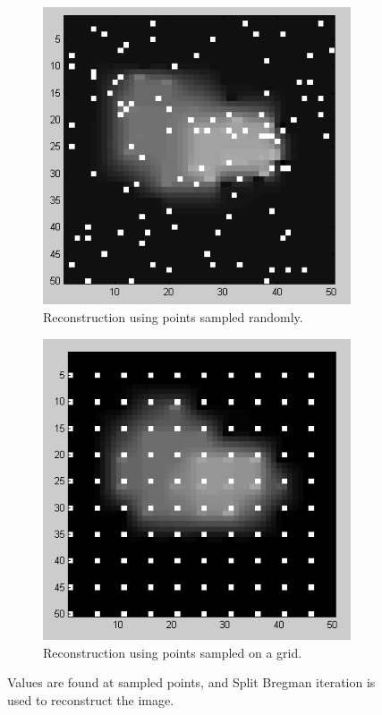 \documentclass[english]{article}\usepackage[]{graphicx}\usepackage[]{color}
\begin{document}
\begin{figure}
\centering
\begin{subfigure}{.5\textwidth}
  \centering
    \includegraphics[width=.9\linewidth]{figures/randompointreconstruction}
  \caption{Reconstruction using points sampled randomly.}
  \label{fig:randrec}
\end{subfigure}%
\begin{subfigure}{.5\textwidth}
  \centering
    \includegraphics[width=.9\linewidth]{figures/gridpointreconstruction}
  \caption{Reconstruction using points sampled on a grid.}
  \label{fig:gridrec}
\end{subfigure}
\caption{Values are found at sampled points, and Split Bregman iteration is used to reconstruct the image.}
\label{fig:samplerec}
\end{figure}
\end{document}
